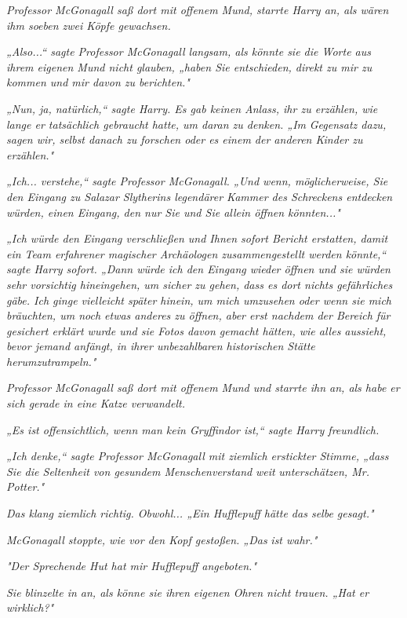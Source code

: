 {\emph{Professor McGonagall saß dort mit offenem Mund, starrte Harry an, als wären ihm soeben zwei Köpfe gewachsen.}

\emph{„Also...“ sagte Professor McGonagall langsam, als könnte sie die Worte aus ihrem eigenen Mund nicht glauben, „haben Sie entschieden, direkt zu mir zu kommen und mir davon zu berichten."}

\emph{„Nun, ja, natürlich,“ sagte Harry. Es gab keinen Anlass, ihr zu erzählen, wie lange er tatsächlich gebraucht hatte, um daran zu denken. „Im} \emph{Gegensatz dazu, sagen wir, selbst danach zu forschen oder es einem der anderen Kinder zu erzählen."}

\emph{„Ich... verstehe,“ sagte Professor McGonagall. „Und wenn, möglicherweise, Sie den Eingang zu Salazar Slytherins legendärer Kammer des Schreckens entdecken würden, einen Eingang, den nur Sie und Sie allein öffnen könnten..."}

\emph{„Ich würde den Eingang verschließen und Ihnen sofort Bericht erstatten, damit ein Team erfahrener magischer Archäologen zusammengestellt werden könnte,“ sagte Harry sofort. „Dann würde ich den Eingang wieder öffnen und sie würden sehr vorsichtig hineingehen, um sicher zu gehen, dass es dort nichts gefährliches gäbe. Ich ginge vielleicht später hinein, um mich umzusehen oder wenn sie mich bräuchten, um noch etwas anderes zu öffnen, aber erst nachdem der Bereich für gesichert erklärt wurde und sie Fotos davon gemacht hätten, wie alles aussieht, bevor jemand anfängt, in ihrer unbezahlbaren historischen Stätte herumzutrampeln."}

\emph{Professor McGonagall saß dort mit offenem Mund und starrte ihn an, als habe er sich gerade in eine Katze verwandelt.}

\emph{„Es ist offensichtlich, wenn man kein Gryffindor ist,“ sagte Harry freundlich.}

\emph{„Ich denke,“ sagte Professor McGonagall mit ziemlich erstickter Stimme, „dass Sie die Seltenheit von gesundem Menschenverstand} \emph{\emph{weit}} \emph{unterschätzen, Mr. Potter."}

\emph{Das klang ziemlich richtig. Obwohl... „Ein Hufflepuff hätte das selbe gesagt."}

\emph{McGonagall stoppte, wie vor den Kopf gestoßen. „\emph{Das}} \emph{ist wahr."}

\emph{"Der Sprechende Hut hat mir Hufflepuff angeboten."}

\emph{Sie blinzelte in an, als könne sie ihren eigenen Ohren nicht trauen. „Hat er} \emph{\emph{wirklich?}"}

}
